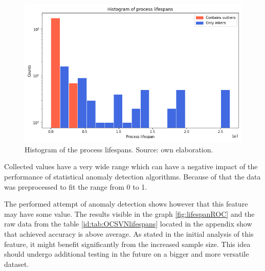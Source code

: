 \documentclass[a4paper,twoside,12pt]{book}
\begin{document}
\begin{figure}
	\centering
	\includegraphics[scale=0.9]{images/LifespanHist}
	\caption{Histogram of the process lifespans. Source: own elaboration.}
	\label{fig:lifespanHist}
 \end{figure}


Collected values have a very wide range which can have a negative impact of the performance of statistical anomaly detection algorithms.
Because of that the data was preprocessed to fit the range from 0 to 1. 

The performed attempt of anomaly detection shows however that this feature may have some value. The results visible in the graph
\ref{fig:lifespanROC} and the raw data from the table \ref{id:tab:OCSVNlifespans} located in the appendix show that achieved accuracy 
is above average. As stated in the initial analysis of this feature, it might benefit significantly from the increased sample size.
This idea should undergo additional testing in the future on a bigger and more versatile dataset.
\end{document}
